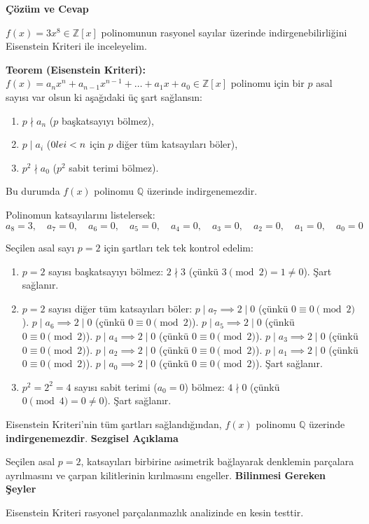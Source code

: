 \documentclass[11pt, a4paper]{article}
\newenvironment{cozum}{
    \vspace{0.5cm}
    \noindent\textcolor{green!60!black}{\faCheckCircle\enspace \textbf{\Large Çözüm ve Cevap}}\par\vspace{0.2cm}
}{}
\newenvironment{sezgisel}{
    \vspace{0.5cm}
    \noindent\textcolor{orange!80!black}{\faLightbulb\enspace \textbf{\Large Sezgisel Açıklama}}\par\vspace{0.2cm}
    \itshape
}{}
\newenvironment{bilgi}{
    \vspace{0.5cm}
    \noindent\textcolor{red!70!black}{\faExclamationTriangle\enspace \textbf{\Large Bilinmesi Gereken Şeyler}}\par\vspace{0.2cm}
}{}
\begin{document}
\begin{cozum}
$f(x) = 3x^{8} \in \mathbb{Z}[x]$ polinomunun rasyonel sayılar üzerinde indirgenebilirliğini Eisenstein Kriteri ile inceleyelim.

\textbf{Teorem (Eisenstein Kriteri):} $f(x) = a_n x^n + a_{n-1} x^{n-1} + \dots + a_1 x + a_0 \in \mathbb{Z}[x]$ polinomu için bir $p$ asal sayısı var olsun ki aşağıdaki üç şart sağlansın:
\begin{enumerate}
    \item $p \nmid a_n$ ($p$ başkatsayıyı bölmez),
    \item $p \mid a_i$ ($0 \\le i < n$ için $p$ diğer tüm katsayıları böler),
    \item $p^2 \nmid a_0$ ($p^2$ sabit terimi bölmez).
\end{enumerate}
Bu durumda $f(x)$ polinomu $\mathbb{Q}$ üzerinde indirgenemezdir.

Polinomun katsayılarını listelersek:
\[ a_{8} = 3, \quad a_{7} = 0, \quad a_{6} = 0, \quad a_{5} = 0, \quad a_{4} = 0, \quad a_{3} = 0, \quad a_{2} = 0, \quad a_{1} = 0, \quad a_{0} = 0 \]

Seçilen asal sayı $p = 2$ için şartları tek tek kontrol edelim:
\begin{enumerate}
    \item $p = 2$ sayısı başkatsayıyı bölmez: $2 \nmid 3$ (çünkü $3 \pmod{2} = 1 \neq 0$). Şart sağlanır.
    \item $p = 2$ sayısı diğer tüm katsayıları böler:
    $p \mid a_{7} \implies 2 \mid 0$ (çünkü $0 \equiv 0 \pmod{2}$).
    $p \mid a_{6} \implies 2 \mid 0$ (çünkü $0 \equiv 0 \pmod{2}$).
    $p \mid a_{5} \implies 2 \mid 0$ (çünkü $0 \equiv 0 \pmod{2}$).
    $p \mid a_{4} \implies 2 \mid 0$ (çünkü $0 \equiv 0 \pmod{2}$).
    $p \mid a_{3} \implies 2 \mid 0$ (çünkü $0 \equiv 0 \pmod{2}$).
    $p \mid a_{2} \implies 2 \mid 0$ (çünkü $0 \equiv 0 \pmod{2}$).
    $p \mid a_{1} \implies 2 \mid 0$ (çünkü $0 \equiv 0 \pmod{2}$).
    $p \mid a_{0} \implies 2 \mid 0$ (çünkü $0 \equiv 0 \pmod{2}$).
    Şart sağlanır.
    \item $p^2 = 2^2 = 4$ sayısı sabit terimi ($a_0 = 0$) bölmez: $4 \nmid 0$ (çünkü $0 \pmod{4} = 0 \neq 0$). Şart sağlanır.
\end{enumerate}

Eisenstein Kriteri'nin tüm şartları sağlandığından, $f(x)$ polinomu $\mathbb{Q}$ üzerinde \textbf{indirgenemezdir}.
\end{cozum}
\begin{sezgisel}
Seçilen asal $p=2$, katsayıları birbirine asimetrik bağlayarak denklemin parçalara ayrılmasını ve çarpan kilitlerinin kırılmasını engeller.
\end{sezgisel}
\begin{bilgi}
Eisenstein Kriteri rasyonel parçalanmazlık analizinde en kesin testtir.
\end{bilgi}
\end{document}
